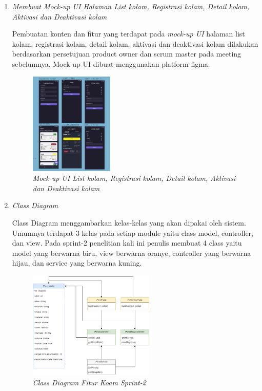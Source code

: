 \begin{enumerate}[listparindent=2em]
	
	\item{\textit{Membuat Mock-up UI Halaman List kolam, Registrasi kolam, Detail kolam, Aktivasi dan Deaktivasi kolam}}
	
	Pembuatan konten dan fitur yang terdapat pada \textit{mock-up UI} halaman list kolam, registrasi kolam, detail kolam, aktivasi dan deaktivasi kolam dilakukan berdasarkan persetujuan product owner dan scrum master pada meeting sebelumnya. Mock-up UI dibuat menggunakan platform figma.
	
	\begin{figure}[H]
	\centering
	\includegraphics[keepaspectratio, width=4cm]{gambar/mockupsprint2}
	\caption{\textit{Mock-up UI List kolam, Registrasi kolam, Detail kolam, Aktivasi dan Deaktivasi kolam}}
	\label{gambar:mockupsprint2}
	\end{figure}

	\item{\textit{Class Diagram}}
	
	Class Diagram menggambarkan kelas-kelas yang akan dipakai oleh sistem. Umumnya terdapat 3 kelas pada setiap module yaitu class model, controller, dan view. Pada sprint-2 penelitian kali ini penulis membuat 4 class yaitu model yang berwarna biru, view berwarna oranye, controller yang berwarna hijau, dan service yang berwarna kuning.
	 
	 \begin{figure}[H]
	 \centering
	 \includegraphics[keepaspectratio, width=6cm]{gambar/pondcd}
	 \caption{\textit{Class Diagram Fitur Koam Sprint-2}}
	 \label{gambar:pondcd}
	 \end{figure}


\end{enumerate}
